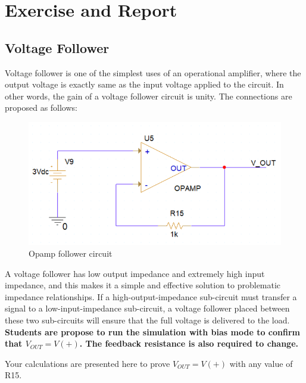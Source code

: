 \section{Exercise and Report}
\subsection{Voltage Follower}
Voltage follower is one of the simplest uses of an operational amplifier, where the output voltage is exactly same as the input voltage applied to the circuit. In other words, the gain of a voltage follower circuit is unity. The connections are proposed as follows:


\begin{figure}[!htp]
    \centering
    \includegraphics[width = 4.5in]{source/picture/bai_5/opam_follower.PNG}
    \caption{Opamp follower circuit}
    \label{lab05_opamp_follower}
\end{figure}

A voltage follower has low output impedance and extremely high input impedance, and this makes it a simple and effective solution to problematic impedance relationships. If a high-output-impedance sub-circuit must transfer a signal to a low-input-impedance sub-circuit, a voltage follower placed between these two sub-circuits will ensure that the full voltage is delivered to the load.\\

\textbf{Students are propose to run the simulation with bias mode to confirm that $V_{OUT} = V(+)$. The feedback resistance is also required to change.\\}

Your calculations are presented here to prove $V_{OUT} = V(+)$ with any value of R15. 



